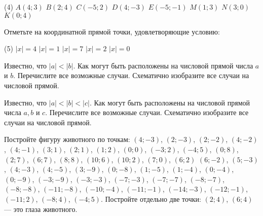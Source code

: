 \begin{class}[number=1-2]
\begin{listofex}[resume]
		\begin{tasks}(4)
			\task \( A(4;3) \)
			\task \( B(2;4) \)
			\task \( C(-5;2) \)
			\task \( D(4;-3) \)
			\task \( E(-5;-1) \)
			\task \( M(1;3) \)
			\task \( N(3;0) \)
			\task \( K(0;4) \)
		\end{tasks}
		\item Отметьте на координатной прямой точки, удовлетворяющие условию:
		\begin{tasks}(5)
			\task \( |x|=4 \)
			\task \( |x|=1 \)
			\task \( |x|=7 \)
			\task \( |x|=2 \)
			\task \( |x|=0 \)
		\end{tasks}
		\item Известно, что \( |a|<|b| \). Как могут быть расположены на числовой прямой числа \( a \) и \( b \). Перечислите все возможные случаи. Схематично изобразите все случаи на числовой прямой.
		\item Известно, что \( |a|<|b|<|c| \). Как могут быть расположены на числовой прямой числа \(a, b\) и \(c\). Перечислите все возможные случаи. Схематично изобразите все случаи на числовой прямой.
		\item Постройте фигуру животного по точкам: \( (4;-3) \), \( (2;-3) \), \( (2;-2) \), \( (4;-2) \), \( (4;-1) \), \( (3;1) \), \( (2;1) \), \( (1;2) \), \( (0;0) \), \( (-3;2) \), \( (-4;5) \), \( (0;8) \), \( (2;7) \), \( (6;7) \), \( (8;8) \), \( (10;6) \), \( (10;2) \), \( (7;0) \), \( (6;2) \) \( (6;-2) \), \( (5;-3) \), \( (4;-3) \), \( (4;-5) \), \( (3;-9) \), \( (0;-8) \), \( (1;-5) \), \( (1;-4) \), \( (0;-4) \), \( (0;-9) \), \( (-3;-9) \), \( (-3;-3) \), \( (-7;-3) \), \( (-7;-7) \),  \( (-8;-7) \), \( (-8;-8) \), \( (-11;-8) \), \( (-10;-4) \), \( (-11;-1) \), \( (-14;-3) \), \( (-12;-1) \), \( (-11;2) \), \( (-8;4) \), \( (-4;5) \). Постройте отдельно две точки: \( (2;4) \), \( (6;4) \) --- это глаза животного.
	\end{listofex}
\end{class}

